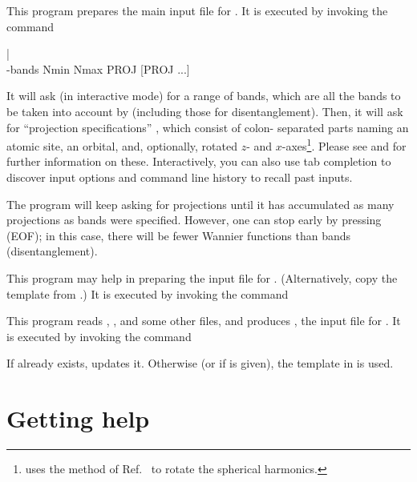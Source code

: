 This program prepares the main input file  for
\wiiw.  It is executed by invoking the command
%
\begin{usage}
  \writeinwf {} |
  \\
  \writeinwf{} -bands Nmin Nmax PROJ [PROJ ...]
\end{usage}
%
It will ask (in interactive mode) for a range of bands, which are all
the bands to be taken into account by \wiiw (including those for
disentanglement).  Then, it will ask for ``projection specifications''
, which consist of colon-
separated parts naming an atomic site, an orbital, and, optionally,
rotated $z$- and $x$-axes\footnote{\writeinwf uses the method of
  Ref.~\cite{ylmrot} to rotate the spherical harmonics.}.  Please see
 and 
for further information on these.  Interactively, you can also use tab
completion to discover input options and command line history to
recall past inputs.

The program will keep asking for projections until it has accumulated
as many projections as bands were specified.  However, one can stop
early by pressing  (EOF); in this case, there will be
fewer Wannier functions than bands (disentanglement).



This program may help in preparing the input file for \wplot.
(Alternatively, copy the template from
.)  It is executed by invoking the
command
%
\begin{usage}
  \writeinwplot \case
\end{usage}



This program reads , , and some
other files, and produces , the input file for
\wannierx.  It is executed by invoking the command
%
\begin{usage}
  \writewin [-fresh]
\end{usage}

If  already exists,  updates it.
Otherwise (or if  is given), the template in
 is used.


\chapter{Getting help}

